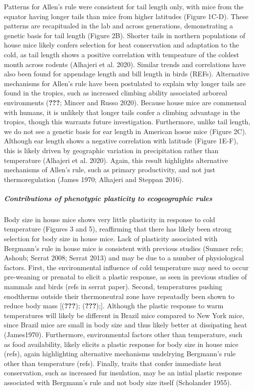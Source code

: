 \documentclass[]{article}
\let\oldsubparagraph\subparagraph
\renewcommand{\subparagraph}[1]{\oldsubparagraph{#1}\mbox{}}
\begin{document}
Patterns for Allen's rule were consistent for tail length only, with
mice from the equator having longer tails than mice from higher
latitudes (Figure 1C-D). These patterns are recapitualed in the lab and
across generations, demonstrating a genetic basis for tail length
(Figure 2B). Shorter tails in northern populations of house mice likely
confers selection for heat conservation and adaptation to the cold, as
tail length shows a positive correlation with tempeature of the coldest
month across rodents (Alhajeri et al. 2020). Similar trends and
correlations have also been found for appendage length and bill length
in birds (REFs). Alternative mechanisms for Allen's rule have been
postulated to explain why longer tails are found in the tropics, such as
increased climbing ability associated arboreal environments
({\textbf{???}}; Mincer and Russo 2020). Because house mice are
commensal with humans, it is unlikely that longer tails confer a
climbing advantage in the tropics, though this warrants future
investigation. Furthermore, unlike tail length, we do not see a genetic
basis for ear length in American hosue mice (Figure 2C). Although ear
length shows a negative correlation with latitude (Figure 1E-F), this is
likely driven by geographic variation in precipitation rather than
temperature (Alhajeri et al. 2020). Again, this result highlights
alternative mechanisms of Allen's rule, such as primary productivity,
and not just thermoregulation (James 1970; Alhajeri and Steppan 2016).

\hypertarget{contributions-of-phenotypic-plasticity-to-ecogeographic-rules}{%
\subparagraph{\texorpdfstring{\emph{Contributions of phenotypic
plasticity to ecogeographic
rules}}{Contributions of phenotypic plasticity to ecogeographic rules}}\label{contributions-of-phenotypic-plasticity-to-ecogeographic-rules}}

Body size in house mice shows very little plasticity in response to cold
temperature (Figures 3 and 5), reaffirming that there has likely been
strong selection for body size in house mice. Lack of plasticity
associated with Bergmann's rule in house mice is consistent with
previous studies (Sumner refs; Ashoub; Serrat 2008; Serrat 2013) and may
be due to a number of physiological factors. First, the environmental
influence of cold temperature may need to occur pre-weaning or prenatal
to elicit a plastic response, as seen in previous studies of mammals and
birds (refs in serrat paper). Second, temperatures pushing enodtherms
outside their thermoneutral zone have repeatadly been shown to reduce
body mass {[}({\textbf{???}}); ({\textbf{???}});{]}. Although the
plastic response to warm temperatures will likely be different in Brazil
mice compared to New York mice, since Brazil mice are small in body size
and thus likely better at dissipating heat (James1970). Furthermore,
environmental factors other than temperature, such as food availability,
likely elicits a plastic response for body size in house mice (refs),
again highlighting alternative mechanisms undelrying Bergmann's rule
other than temperature (refs). Finally, traits that confer immediate
heat conservation, such as increased fur insulation, may be an intial
plastic response associated with Bergmann's rule and not body size
itself (Scholander 1955).
\end{document}
